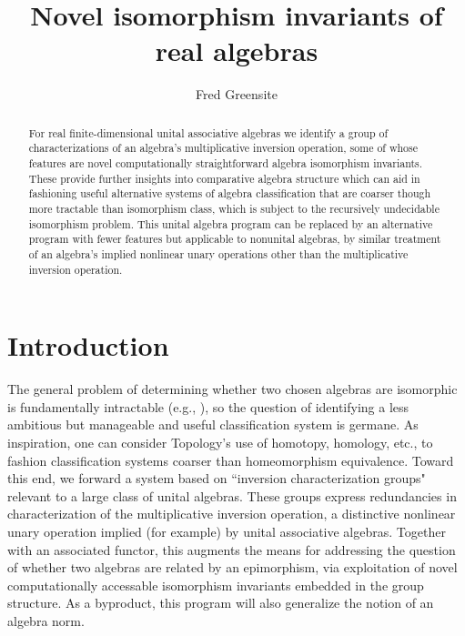 \documentclass{amsart}
\numberwithin{equation}{section}
\theoremstyle{definition}
\numberwithin{theorem}{section}
\begin{document}
       
             \title{Novel isomorphism invariants of real algebras}
    \author{Fred Greensite}
    
   \begin{abstract}  For real finite-dimensional unital associative algebras we identify a group of characterizations of an algebra's multiplicative inversion operation, some of whose features are novel computationally straightforward algebra isomorphism invariants.  These provide further insights into comparative algebra structure which can aid in fashioning useful alternative systems of algebra classification that are coarser though more tractable than isomorphism class, which is subject to the recursively undecidable isomorphism problem.  This unital algebra program can be replaced by an alternative program with fewer features but applicable to nonunital algebras, by similar treatment of an algebra's implied nonlinear unary operations other than the multiplicative inversion operation.
   \end{abstract}
        
  \maketitle
  
 
  \section{Introduction} The general problem of determining whether two chosen algebras are isomorphic is fundamentally intractable (e.g., \cite{drozd:1972,prest:1991,belitskii:2003}), so the question of identifying a  less ambitious but manageable and useful classification system is germane.  As inspiration, one can consider Topology's use of homotopy, homology, etc., to fashion classification systems coarser than homeomorphism equivalence.  Toward this end, we forward a system based on  ``inversion characterization groups" relevant to a large class of unital algebras.  These groups express redundancies in characterization of the multiplicative inversion operation, a distinctive nonlinear unary operation implied (for example) by unital associative algebras. Together with an associated functor, this augments the means for addressing the question of whether two algebras are related by an epimorphism, via exploitation of novel computationally accessable isomorphism invariants embedded in the group structure. 
    As a byproduct, this program will also generalize the notion of an algebra norm. 
  
\end{document}

